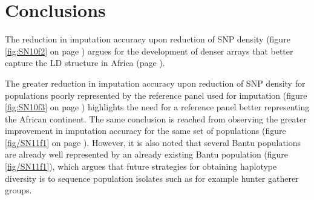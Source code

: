 \section{Conclusions}

The reduction in imputation accuracy upon reduction of \gls{SNP} density (figure \ref{fig:SN10f2} on page \pageref{fig:SN10f2}) argues for the development of denser arrays that better capture the \gls{LD} structure in Africa (page \pageref{ch:chip_design}).

The greater reduction in imputation accuracy upon reduction of \gls{SNP} density for populations poorly represented by the reference panel used for imputation (figure \ref{fig:SN10f3} on page \pageref{fig:SN10f3}) highlights the need for a reference panel better representing the African continent. The same conclusion is reached from observing the greater improvement in imputation accuracy for the same set of populations (figure \ref{fig/SN11f1} on page \pageref{fig/SN11f1}). However, it is also noted that several Bantu populations are already well represented by an already existing Bantu population (figure \ref{fig/SN11f1}), which argues that future strategies for obtaining haplotype diversity is to sequence population isolates such as for example hunter gatherer groups.